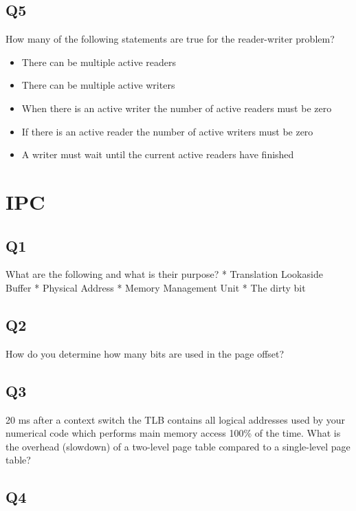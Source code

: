 \subsection{Q5}\label{q5-1}

How many of the following statements are true for the reader-writer problem?

\begin{itemize}
\tightlist
\item
  There can be multiple active readers
\item
  There can be multiple active writers
\item
  When there is an active writer the number of active readers must be zero
\item
  If there is an active reader the number of active writers must be zero
\item
  A writer must wait until the current active readers have finished
\end{itemize}

\section{IPC}

\subsection{Q1}\label{q1-2}

What are the following and what is their purpose? * Translation Lookaside Buffer * Physical Address * Memory Management Unit * The dirty bit

\subsection{Q2}\label{q2-2}

How do you determine how many bits are used in the page offset?

\subsection{Q3}\label{q3-2}

20 ms after a context switch the TLB contains all logical addresses used by your numerical code which performs main memory access 100\% of the time. What is the overhead (slowdown) of a two-level page table compared to a single-level page table?

\subsection{Q4}\label{q4-2}

